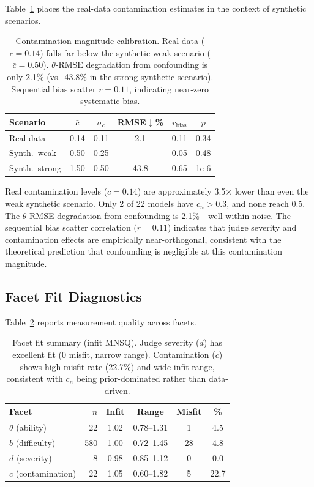 \documentclass[11pt]{article}
\begin{document}
Table~\ref{tab:calibration} places the real-data contamination estimates in the context of synthetic scenarios.

\begin{table}[t]
\centering
\small
\begin{tabular}{lccccc}
\toprule
Scenario & $\bar{c}$ & $\sigma_c$ & RMSE$\downarrow$\% & $r_{\text{bias}}$ & $p$ \\
\midrule
Real data & 0.14 & 0.11 & 2.1 & 0.11 & 0.34 \\
Synth.\ weak & 0.50 & 0.25 & --- & 0.05 & 0.48 \\
Synth.\ strong & 1.50 & 0.50 & 43.8 & 0.65 & 1e-6 \\
\bottomrule
\end{tabular}
\caption{Contamination magnitude calibration. Real data ($\bar{c} = 0.14$) falls far below the synthetic weak scenario ($\bar{c} = 0.50$). $\theta$-RMSE degradation from confounding is only 2.1\% (vs.\ 43.8\% in the strong synthetic scenario). Sequential bias scatter $r = 0.11$, indicating near-zero systematic bias.}
\label{tab:calibration}
\end{table}

Real contamination levels ($\bar{c} = 0.14$) are approximately 3.5$\times$ lower than even the weak synthetic scenario. Only 2 of 22 models have $c_n > 0.3$, and none reach 0.5. The $\theta$-RMSE degradation from confounding is 2.1\%---well within noise. The sequential bias scatter correlation ($r = 0.11$) indicates that judge severity and contamination effects are empirically near-orthogonal, consistent with the theoretical prediction that confounding is negligible at this contamination magnitude.

\subsection{Facet Fit Diagnostics}
\label{sec:diagnostics}

Table~\ref{tab:fit_diag} reports measurement quality across facets.

\begin{table}[t]
\centering
\small
\begin{tabular}{lrcccc}
\toprule
Facet & $n$ & Infit & Range & Misfit & \% \\
\midrule
$\theta$ (ability) & 22 & 1.02 & 0.78--1.31 & 1 & 4.5 \\
$b$ (difficulty) & 580 & 1.00 & 0.72--1.45 & 28 & 4.8 \\
$d$ (severity) & 8 & 0.98 & 0.85--1.12 & 0 & 0.0 \\
$c$ (contamination) & 22 & 1.05 & 0.60--1.82 & 5 & 22.7 \\
\bottomrule
\end{tabular}
\caption{Facet fit summary (infit MNSQ). Judge severity ($d$) has excellent fit (0 misfit, narrow range). Contamination ($c$) shows high misfit rate (22.7\%) and wide infit range, consistent with $c_n$ being prior-dominated rather than data-driven.}
\label{tab:fit_diag}
\end{table}
\end{document}
